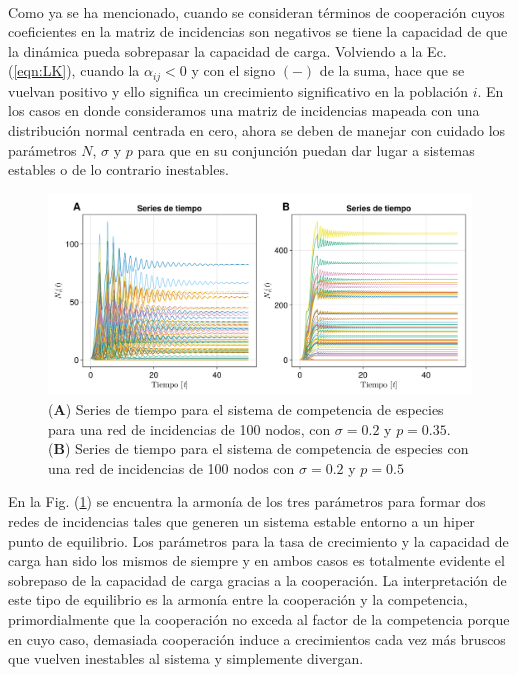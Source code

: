 \\
Como ya se ha mencionado, cuando se consideran términos de cooperación cuyos coeficientes en la matriz de incidencias son negativos se tiene la capacidad de que la dinámica pueda sobrepasar la capacidad de carga. Volviendo a la Ec. (\ref{eqn:LK}), cuando la $\alpha_{ij}<0$ y con el signo $(-)$ de la suma, hace que se vuelvan positivo y ello significa un crecimiento significativo en la población $i$. En los casos en donde consideramos una matriz de incidencias mapeada con una distribución normal centrada en cero, ahora se deben de manejar con cuidado los parámetros $N$, $\sigma$ y $p$ para que en su conjunción puedan dar lugar a sistemas estables o de lo contrario inestables.
\begin{figure}[h!]
	\centering
	\includegraphics[scale=0.23]{../Imagenes/Series de Tiempo LK100}
	\caption{(\textbf{A}) Series de tiempo para el sistema de competencia de especies para una red de incidencias de 100 nodos, con $\sigma=0.2$ y $p=0.35$. (\textbf{B}) Series de tiempo para el sistema de competencia de especies con una red de incidencias de 100 nodos con $\sigma=0.2$ y $p=0.5$}
	\label{fig:SeriesdeTiempoLK100}
\end{figure}
En la Fig. (\ref{fig:SeriesdeTiempoLK100}) se encuentra la armonía de los tres parámetros para formar dos redes de incidencias tales que generen un sistema estable entorno a un hiper punto de equilibrio. Los parámetros para la tasa de crecimiento y la capacidad de carga han sido los mismos de siempre y en ambos casos es totalmente evidente el sobrepaso de la capacidad de carga gracias a la cooperación. La interpretación de este tipo de equilibrio es la armonía entre la cooperación y la competencia, primordialmente que la cooperación no exceda al factor de la competencia porque en cuyo caso, demasiada cooperación induce a crecimientos cada vez más bruscos que vuelven inestables al sistema y simplemente divergan.